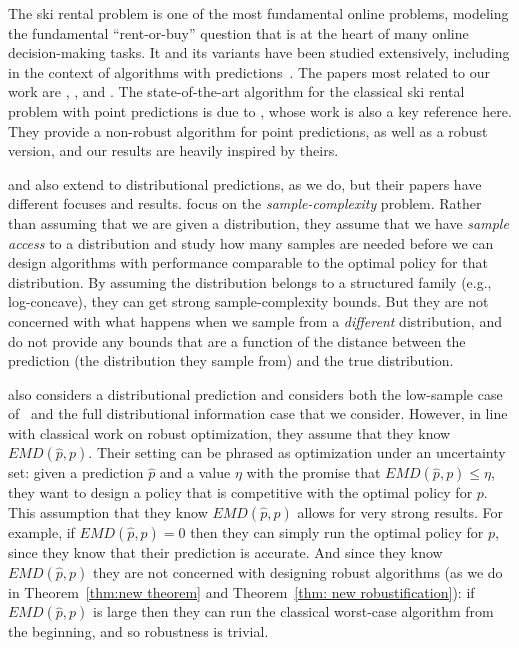 The ski rental problem is one of the most fundamental online problems, modeling the fundamental ``rent-or-buy'' question that is at the heart of many online decision-making tasks.  It and its variants have been studied extensively, including in the context of algorithms with predictions~\citep{antoniadis2021learningaugmenteddynamicpowermanagement,besbes,BHATTACHARYA202239,diakonikolas2021learning,kumar2024improvingonlinealgorithmsml,shen2025algorithmscalibratedmachinelearning,shin2023optimalconsistencyrobustnesstradeofflearningaugmented,pmlr-v202-shin23c,wang2020onlinealgorithmsmultishopski}.  The papers most related to our work are \citet{kumar2024improvingonlinealgorithmsml}, \citet{diakonikolas2021learning}, and \citet{besbes}.  The state-of-the-art algorithm for the classical ski rental problem with point predictions is due to \citet{kumar2024improvingonlinealgorithmsml}, whose work is also a key reference here.  They provide a non-robust algorithm for point predictions, as well as a robust version, and our results are heavily inspired by theirs.

\citet{diakonikolas2021learning} and \citet{besbes} also extend to distributional predictions, as we do, but their papers have different focuses and results.  \citet{diakonikolas2021learning} focus on the \emph{sample-complexity} problem. Rather than assuming that we are given a distribution, they assume that we have \emph{sample access} to a distribution and study how many samples are needed before we can design algorithms with performance comparable to the optimal policy for that distribution.  By assuming the distribution belongs to a structured family (e.g., log-concave), they can get strong sample-complexity bounds.  But they are not concerned with what happens when we sample from a \emph{different} distribution, and do not provide any bounds that are a function of the distance between the prediction (the distribution they sample from) and the true distribution.

\citet{besbes} also considers a distributional prediction and considers both the low-sample case of~\citet{diakonikolas2021learning} and the full distributional information case that we consider.  However, in line with classical work on robust optimization, they assume that they know $EMD(\hat p, p)$. Their setting can be phrased as optimization under an uncertainty set: given a prediction $\hat p$ and a value $\eta$ with the promise that $EMD(\hat p, p) \leq \eta$, they want to design a policy that is competitive with the optimal policy for $p$.  This assumption that they know $EMD(\hat p, p)$ allows for very strong results.  For example, if $EMD(\hat p, p) = 0$ then they can simply run the optimal policy for $p$, since they know that their prediction is accurate.  And since they know $EMD(\hat p, p)$ they are not concerned with designing robust algorithms (as we do in Theorem~\ref{thm:new theorem} and Theorem~\ref{thm: new robustification}): if $EMD(\hat p, p)$ is large then they can run the classical worst-case algorithm from the beginning, and so robustness is trivial. 
